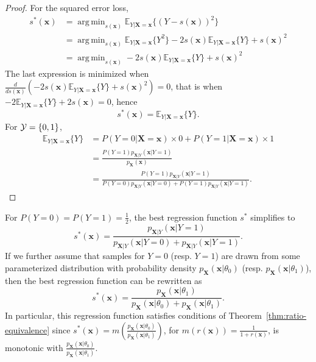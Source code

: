 \documentclass[12pt]{article}
\DeclareMathOperator*{\argmin}{arg\,min}
\numberwithin{equation}{section}
\theoremstyle{plain}
\begin{document}
\begin{proof}
For the squared error loss,
\begin{align}
s^*(\mathbf{x}) &= \argmin_{s(\mathbf{x})} \mathbb{E}_{Y|\mathbf{X}=\mathbf{x}} \{ (Y - s(\mathbf{x}))^2 \} \nonumber \\
&=  \argmin_{s(\mathbf{x})} \mathbb{E}_{Y|\mathbf{X}=\mathbf{x}} \{ Y^2 \} - 2s(\mathbf{x}) \mathbb{E}_{Y|\mathbf{X}=\mathbf{x}} \{ Y \} + s(\mathbf{x})^2 \nonumber \\
&=  \argmin_{s(\mathbf{x})} -2s(\mathbf{x}) \mathbb{E}_{Y|\mathbf{X}=\mathbf{x}} \{ Y \} + s(\mathbf{x})^2
\end{align}
The last expression is minimized when $\frac{d}{ds(\mathbf{x})} (-2s(\mathbf{x}) \mathbb{E}_{Y|\mathbf{X}=\mathbf{x}} \{ Y \} + s(\mathbf{x})^2) = 0$,
that is when $-2 \mathbb{E}_{Y|\mathbf{X}=\mathbf{x}} \{ Y \} + 2 s(\mathbf{x}) = 0$, hence
\begin{equation}
s^*(\mathbf{x}) = \mathbb{E}_{Y|\mathbf{X}=\mathbf{x}} \{ Y \}.
\end{equation}
For ${\cal Y} = \{ 0, 1 \}$,
\begin{align}
\mathbb{E}_{Y|\mathbf{X}=\mathbf{x}} \{ Y \} &= P(Y=0|\mathbf{X}=\mathbf{x}) \times 0 +  P(Y=1|\mathbf{X}=\mathbf{x}) \times 1 \nonumber \\
&= \frac{P(Y=1) p_{\mathbf{X}|Y}(\mathbf{x}|Y=1)}{p_{\mathbf{X}}(\mathbf{x})} \nonumber \\
&= \frac{P(Y=1) p_{\mathbf{X}|Y}(\mathbf{x}|Y=1)}{P(Y=0) p_{\mathbf{X}|Y}(\mathbf{x} | Y=0) + P(Y=1) p_{\mathbf{X}|Y}(\mathbf{x} | Y=1)}.
\end{align}
\end{proof}

For $P(Y=0)=P(Y=1)=\frac{1}{2}$, the best regression function $s^*$ simplifies
to
\begin{equation}
s^*(\mathbf{x}) = \frac{p_{\mathbf{X}|Y}(\mathbf{x}|Y=1)}{p_{\mathbf{X}|Y}(\mathbf{x} | Y=0) + p_{\mathbf{X}|Y}(\mathbf{x} | Y=1)}.
\end{equation}
If we further assume that samples for $Y=0$ (resp. $Y=1$) are drawn from some parameterized
distribution with probability density $p_{\mathbf{X}}(\mathbf{x}|\theta_0)$ (resp. $p_{\mathbf{X}}(\mathbf{x}|\theta_1)$), then the best regression function can be rewritten
as
\begin{equation}
s^*(\mathbf{x}) = \frac{p_{\mathbf{X}}(\mathbf{x}|\theta_1)}{p_{\mathbf{X}}(\mathbf{x} | \theta_0) + p_{\mathbf{X}}(\mathbf{x} | \theta_1)}.
\end{equation}
In particular, this regression function satisfies conditions of
Theorem~\ref{thm:ratio-equivalence} since $s^*(\mathbf{x}) =
m(\frac{p_\mathbf{X}(\mathbf{x}|\theta_0)}{p_\mathbf{X}(\mathbf{x}|\theta_1)})$,
for $m(r(\mathbf{x})) = \frac{1}{1 + r(\mathbf{x})}$, is monotonic with
$\frac{p_\mathbf{X}(\mathbf{x}|\theta_0)}{p_\mathbf{X}(\mathbf{x}|\theta_1)}$.
\end{document}
